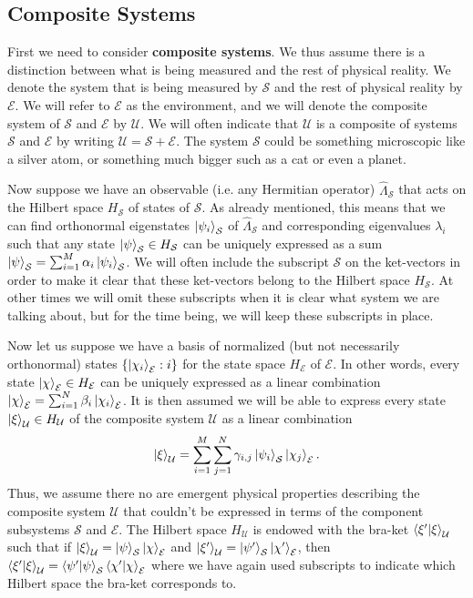 \documentclass[letter, 12pt]{turabian-thesis}
\theoremstyle{hypothesis}
\begin{document}
\subsection{Composite Systems} First we need to consider \textbf{composite systems}. We thus assume there is a distinction between what is being measured and the rest of physical reality. We denote the system that is being measured by $\mathcal{S}$ and the rest of physical reality by $\mathcal{E}$. We will refer to $\mathcal{E}$ as the environment, and we will denote the composite system of $\mathcal{S}$ and $\mathcal{E}$ by $\mathcal{U}$. We will often indicate that $\mathcal{U}$ is a composite of systems $\mathcal{S}$ and $\mathcal{E}$ by writing $\mathcal{U}=\mathcal{S}+\mathcal{E}$. The system $\mathcal{S}$ could be something microscopic like a silver atom, or something much bigger such as a cat or even a planet.

Now suppose we have an observable (i.e. any Hermitian operator) $\hat{\Lambda}_{\mathcal{S}}$ that acts on the Hilbert space $H_\mathcal{S}$ of states of $\mathcal{S}$. As already mentioned, this means that we can find orthonormal eigenstates $\ket{\psi_i}_\mathcal{S}$ of $\hat{\Lambda}_{\mathcal{S}}$ and corresponding eigenvalues $\lambda_i$ such that any state $\ket{\psi}_\mathcal{S}\in H_\mathcal{S}$ can be uniquely expressed as a sum $\ket{\psi}_\mathcal{S}=\sum_{i=1}^M\alpha_i\ket{\psi_i}_\mathcal{S}$. We will often include the subscript $\mathcal{S}$ on the ket-vectors in order to make it clear that these ket-vectors belong to the Hilbert space $H_\mathcal{S}$. At other times we will omit these subscripts when it is clear what system we are talking about, but for the time being, we will keep these subscripts in place.
 
  Now let us suppose we have a basis of normalized (but not necessarily orthonormal) states $\{\ket{\chi_i}_\mathcal{E}:i\}$ for the state space $H_\mathcal{E}$ of $\mathcal{E}$. In other words, every state $\ket{\chi}_\mathcal{E}\in H_\mathcal{E}$ can be uniquely expressed as a linear combination $\ket{\chi}_\mathcal{E}=\sum_{i=1}^N\beta_i\ket{\chi_i}_\mathcal{E}$. It is then assumed we will be able to express every state $\ket{\xi}_\mathcal{U}\in H_\mathcal{U}$ of the composite system $\mathcal{U}$ as a linear combination
  \begin{equation}\label{entangled}\ket{\xi}_\mathcal{U}=\sum_{i=1}^M\sum_{j=1}^N\gamma_{i,j}\ket{\psi_i}_\mathcal{S}\ket{\chi_j}_\mathcal{E}.
  \end{equation}
  Thus, we assume there no are emergent physical properties describing the composite system $\mathcal{U}$ that couldn't be expressed in terms of the component subsystems $\mathcal{S}$ and $\mathcal{E}$. 
  The Hilbert space $H_\mathcal{U}$ is  endowed with the bra-ket $\ip{\xi'}{\xi}_\mathcal{U}$ such that if $\ket{\xi}_\mathcal{U}=\ket{\psi}_\mathcal{S}\ket{\chi}_\mathcal{E}$ and $\ket{\xi'}_\mathcal{U}=\ket{\psi'}_\mathcal{S}\ket{\chi'}_\mathcal{E}$, then $\ip{\xi'}{\xi}_\mathcal{U}=\ip{\psi'}{\psi}_\mathcal{S}\ip{\chi'}{\chi}_\mathcal{E}$ where we have again used subscripts to indicate which Hilbert space the bra-ket corresponds to. 
  
\end{document}
